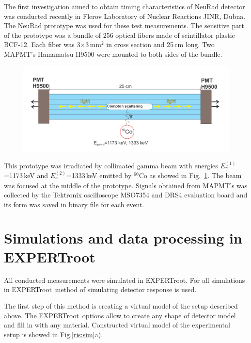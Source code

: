 \documentclass{webofc}
\newcommand{\er}{\textmd{EXPERTroot}}
\begin{document}
The first investigation aimed to obtain timing characteristics of NeuRad detector was conducted recently in Flerov Laboratory of Nuclear Reactions JINR, Dubna. The NeuRad prototype was used for these test measurements. The sensitive part of the prototype was a bundle of 256 optical fibers made of scintillator plastic BCF-12. Each fiber was  3$\times$3\,mm$^2$ in cross section and 25\,cm long.
Two MAPMT's Hamamatsu H9500 were mounted to both sides of the bundle.


\begin{figure}[h]
	\centering
	\includegraphics[width=1\linewidth]{NeuRadexperiment.png}
	\label{ris:neuradexp}
\end{figure}

This prototype was irradiated by collimated gamma beam with energies $E^{(1)}_{\gamma}$=1173\,keV and $E^{(2)}_{\gamma}$=1333\,keV emitted by $^{60}$Co as showed in Fig.~\ref{ris:neuradexp}. The beam was focused at the middle of the prototype. Signals obtained from MAPMT's was collected by the Tektronix oscilloscope MSO7354 and DRS4 evaluation board and its form was saved in binary file for each event.

\section{Simulations and data processing in EXPERTroot}
All conducted measurements were simulated in \er. For all simulations in \er\, method of simulating detector response \cite{er} is used.

The first step of this method is creating a virtual model of the setup described above.
The \er\, options allow to create any shape of detector model and fill in with any material. Constructed virtual model of the experimental setup is showed in Fig.\ref{ris:sim}a). 
\end{document}
